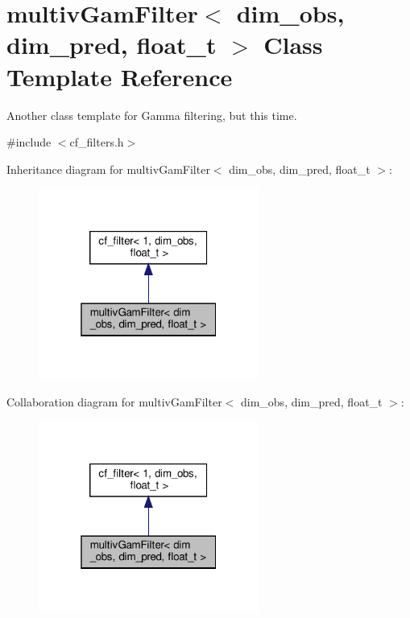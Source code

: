 \hypertarget{classmultivGamFilter}{}\section{multiv\+Gam\+Filter$<$ dim\+\_\+obs, dim\+\_\+pred, float\+\_\+t $>$ Class Template Reference}
\label{classmultivGamFilter}


Another class template for Gamma filtering, but this time.  




{\ttfamily \#include $<$cf\+\_\+filters.\+h$>$}



Inheritance diagram for multiv\+Gam\+Filter$<$ dim\+\_\+obs, dim\+\_\+pred, float\+\_\+t $>$\+:\nopagebreak
\begin{figure}[H]
\begin{center}
\leavevmode
\includegraphics[width=205pt]{classmultivGamFilter__inherit__graph}
\end{center}
\end{figure}


Collaboration diagram for multiv\+Gam\+Filter$<$ dim\+\_\+obs, dim\+\_\+pred, float\+\_\+t $>$\+:\nopagebreak
\begin{figure}[H]
\begin{center}
\leavevmode
\includegraphics[width=205pt]{classmultivGamFilter__coll__graph}
\end{center}
\end{figure}
